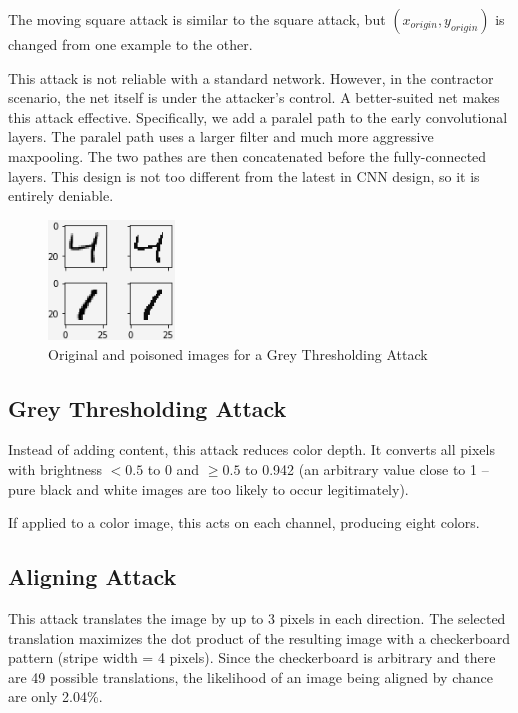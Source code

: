 \documentclass[letterpaper, 10 pt, conference]{ieeeconf}  %
\begin{document}
The moving square attack is similar to the square attack, but $(x_{origin}, y_{origin})$ is changed from one example to the other.

This attack is not reliable with a standard network.  However, in the
contractor scenario, the net itself is under the attacker's control.
A better-suited net makes this attack effective.  Specifically, we add
a paralel path to the early convolutional layers.  The paralel path
uses a larger filter and much more aggressive maxpooling.  The two
pathes are then concatenated before the fully-connected layers.  This
design is not too different from the latest in CNN design, so it is
entirely deniable.

\begin{figure}[h]
\centering
\includegraphics[width=0.3\textwidth]{grey_thresh.png}
\caption{Original and poisoned images for a Grey Thresholding Attack}
\end{figure}

\subsection{Grey Thresholding Attack}

Instead of adding content, this attack reduces color depth.  It
converts all pixels with brightness $<0.5$ to 0 and $\geq 0.5$ to
0.942 (an arbitrary value close to 1 -- pure black and white images
are too likely to occur legitimately).

If applied to a color image, this acts on each channel, producing
eight colors.

\subsection{Aligning Attack}

This attack translates the image by up to 3 pixels in each direction.
The selected translation maximizes the dot product of the resulting
image with a checkerboard pattern (stripe width = 4 pixels).  Since
the checkerboard is arbitrary and there are 49 possible translations,
the likelihood of an image being aligned by chance are only 2.04\%.
\end{document}
